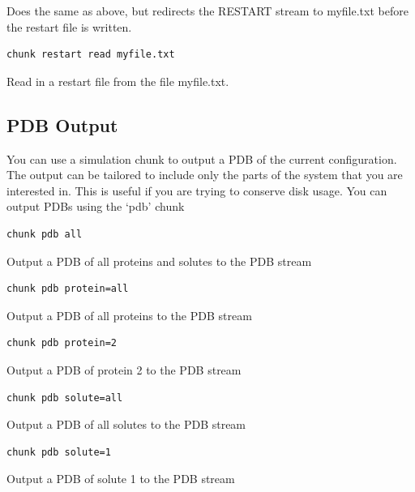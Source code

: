 \documentclass[letterpaper,10pt,english]{sphinxmanual}
\begin{document}
Does the same as above, but redirects the RESTART stream to myfile.txt before the restart file is written.

\begin{Verbatim}[commandchars=\\\{\}]
chunk restart read myfile.txt
\end{Verbatim}

Read in a restart file from the file myfile.txt.


\subsection{PDB Output}
\label{protoms:pdb-output}
You can use a simulation chunk to output a PDB of the current configuration. The output can be tailored to include only the parts of the system that you are interested in. This is useful if you are trying to conserve disk usage. You can output PDBs using the ‘pdb’ chunk

\begin{Verbatim}[commandchars=\\\{\}]
chunk pdb all
\end{Verbatim}

Output a PDB of all proteins and solutes to the PDB stream

\begin{Verbatim}[commandchars=\\\{\}]
chunk pdb protein=all
\end{Verbatim}

Output a PDB of all proteins to the PDB stream

\begin{Verbatim}[commandchars=\\\{\}]
chunk pdb protein=2
\end{Verbatim}

Output a PDB of protein 2 to the PDB stream

\begin{Verbatim}[commandchars=\\\{\}]
chunk pdb solute=all
\end{Verbatim}

Output a PDB of all solutes to the PDB stream

\begin{Verbatim}[commandchars=\\\{\}]
chunk pdb solute=1
\end{Verbatim}

Output a PDB of solute 1 to the PDB stream
\end{document}
